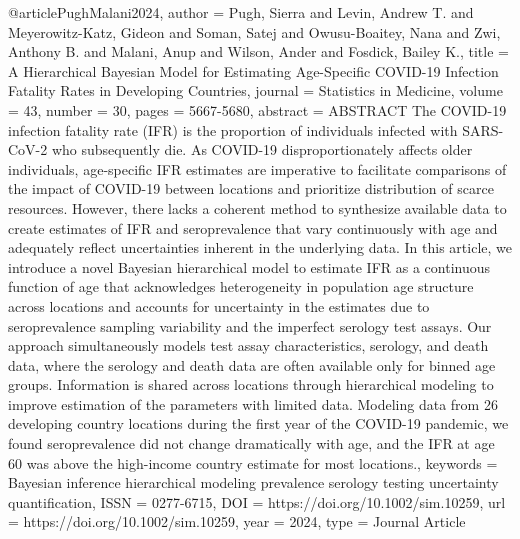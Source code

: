 @article{PughMalani2024,
   author = {Pugh, Sierra and Levin, Andrew T. and Meyerowitz-Katz, Gideon and Soman, Satej and Owusu-Boaitey, Nana and Zwi, Anthony B. and Malani, Anup and Wilson, Ander and Fosdick, Bailey K.},
   title = {A Hierarchical Bayesian Model for Estimating Age-Specific COVID-19 Infection Fatality Rates in Developing Countries},
   journal = {Statistics in Medicine},
   volume = {43},
   number = {30},
   pages = {5667-5680},
   abstract = {ABSTRACT The COVID-19 infection fatality rate (IFR) is the proportion of individuals infected with SARS-CoV-2 who subsequently die. As COVID-19 disproportionately affects older individuals, age-specific IFR estimates are imperative to facilitate comparisons of the impact of COVID-19 between locations and prioritize distribution of scarce resources. However, there lacks a coherent method to synthesize available data to create estimates of IFR and seroprevalence that vary continuously with age and adequately reflect uncertainties inherent in the underlying data. In this article, we introduce a novel Bayesian hierarchical model to estimate IFR as a continuous function of age that acknowledges heterogeneity in population age structure across locations and accounts for uncertainty in the estimates due to seroprevalence sampling variability and the imperfect serology test assays. Our approach simultaneously models test assay characteristics, serology, and death data, where the serology and death data are often available only for binned age groups. Information is shared across locations through hierarchical modeling to improve estimation of the parameters with limited data. Modeling data from 26 developing country locations during the first year of the COVID-19 pandemic, we found seroprevalence did not change dramatically with age, and the IFR at age 60 was above the high-income country estimate for most locations.},
   keywords = {Bayesian inference
hierarchical modeling
prevalence
serology testing
uncertainty quantification},
   ISSN = {0277-6715},
   DOI = {https://doi.org/10.1002/sim.10259},
   url = {https://doi.org/10.1002/sim.10259},
   year = {2024},
   type = {Journal Article}
}

